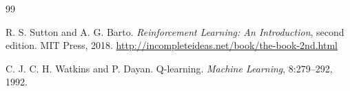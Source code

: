 \begin{thebibliography}{99}

R. S. Sutton and A. G. Barto.
\emph{Reinforcement Learning: An Introduction}, second edition.
MIT Press, 2018. \url{http://incompleteideas.net/book/the-book-2nd.html}

C. J. C. H. Watkins and P. Dayan.
Q-learning. \emph{Machine Learning}, 8:279--292, 1992.

\end{thebibliography}
